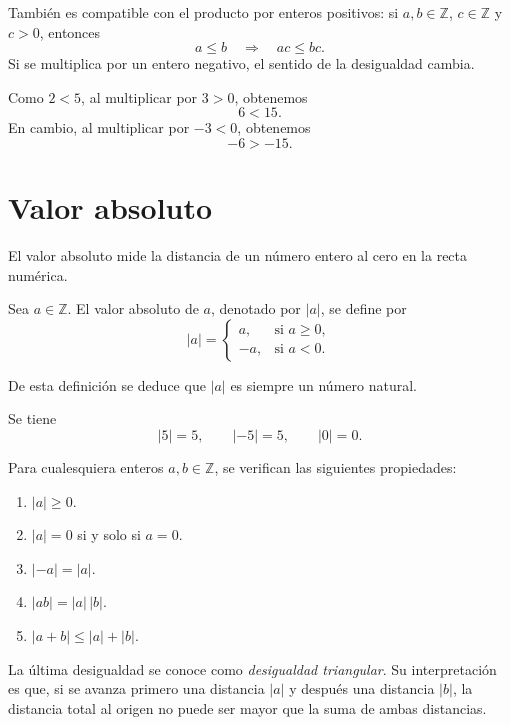 También es compatible con el producto por enteros positivos: si \(a,b\in\mathbb{Z}\), \(c\in\mathbb{Z}\) y \(c>0\), entonces
\[
  a\leq b \quad \Longrightarrow \quad ac\leq bc.
\]
Si se multiplica por un entero negativo, el sentido de la desigualdad cambia.

\begin{ejemplo}
Como \(2<5\), al multiplicar por \(3>0\), obtenemos
\[
  6<15.
\]
En cambio, al multiplicar por \(-3<0\), obtenemos
\[
  -6>-15.
\]
\end{ejemplo}

\section{Valor absoluto}

El valor absoluto mide la distancia de un número entero al cero en la recta numérica.

\begin{definicion}
Sea \(a\in\mathbb{Z}\). El valor absoluto de \(a\), denotado por \(|a|\), se define por
\[
  |a|=
  \begin{cases}
    a, & \text{si } a\geq 0,\\
    -a, & \text{si } a<0.
  \end{cases}
\]
\end{definicion}

De esta definición se deduce que \(|a|\) es siempre un número natural.

\begin{ejemplo}
Se tiene
\[
  |5|=5,
  \qquad
  |-5|=5,
  \qquad
  |0|=0.
\]
\end{ejemplo}

\begin{proposicion}
Para cualesquiera enteros \(a,b\in\mathbb{Z}\), se verifican las siguientes propiedades:
\begin{enumerate}
  \item \(|a|\geq 0\).
  \item \(|a|=0\) si y solo si \(a=0\).
  \item \(|-a|=|a|\).
  \item \(|ab|=|a|\,|b|\).
  \item \(|a+b|\leq |a|+|b|\).
\end{enumerate}
\end{proposicion}

La última desigualdad se conoce como \emph{desigualdad triangular}. Su interpretación es que, si se avanza primero una distancia \(|a|\) y después una distancia \(|b|\), la distancia total al origen no puede ser mayor que la suma de ambas distancias.

